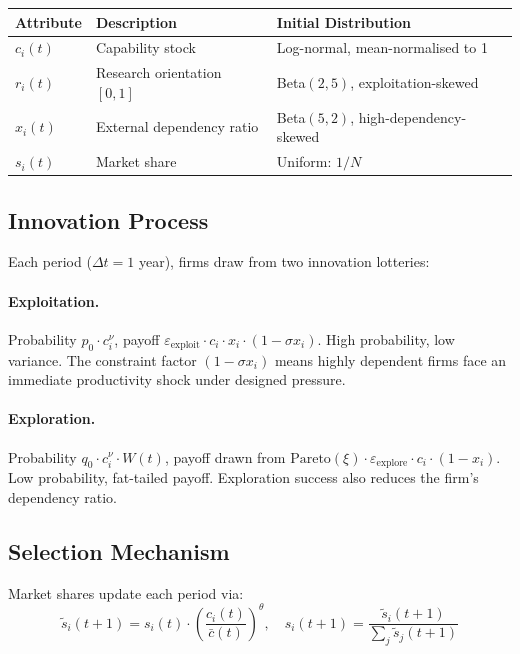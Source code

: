 \documentclass[11pt,a4paper]{article}
\theoremstyle{remark}
\begin{document}
\begin{center}
\begin{tabular}{lll}
\toprule
\textbf{Attribute} & \textbf{Description} & \textbf{Initial Distribution} \\
\midrule
$c_i(t)$ & Capability stock & Log-normal, mean-normalised to 1 \\
$r_i(t)$ & Research orientation $[0,1]$ & Beta$(2, 5)$, exploitation-skewed \\
$x_i(t)$ & External dependency ratio & Beta$(5, 2)$, high-dependency-skewed \\
$s_i(t)$ & Market share & Uniform: $1/N$ \\
\bottomrule
\end{tabular}
\end{center}

\subsection{Innovation Process}

Each period ($\Delta t = 1$ year), firms draw from two innovation lotteries:

\paragraph{Exploitation.} Probability $p_0 \cdot c_i^{\nu}$, payoff $\varepsilon_{\text{exploit}} \cdot c_i \cdot x_i \cdot (1 - \sigma x_i)$. High probability, low variance. The constraint factor $(1 - \sigma x_i)$ means highly dependent firms face an immediate productivity shock under designed pressure.

\paragraph{Exploration.} Probability $q_0 \cdot c_i^{\nu} \cdot W(t)$, payoff drawn from $\text{Pareto}(\xi) \cdot \varepsilon_{\text{explore}} \cdot c_i \cdot (1 - x_i)$. Low probability, fat-tailed payoff. Exploration success also reduces the firm's dependency ratio.

\subsection{Selection Mechanism}

Market shares update each period via:
\begin{equation}
\tilde{s}_i(t+1) = s_i(t) \cdot \left(\frac{c_i(t)}{\bar{c}(t)}\right)^{\theta}, \quad s_i(t+1) = \frac{\tilde{s}_i(t+1)}{\sum_j \tilde{s}_j(t+1)}
\end{equation}
\end{document}
